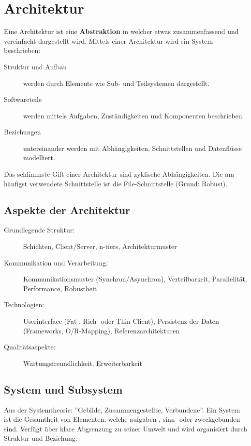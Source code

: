 \section{Architektur}
Eine Architektur ist eine \textbf{Abstraktion} in welcher etwas zusammenfassend und vereinfacht dargestellt wird. Mittels einer Architektur wird ein System beschrieben:

\begin{description}
	\item[Struktur und Aufbau] werden durch Elemente wie Sub- und Teilsystemen dargestellt.
	\item[Softwareteile] werden mittels Aufgaben, Zuständigkeiten und Komponenten beschrieben.
	\item [Beziehungen] untereinander werden mit Abhängigkeiten, Schnittstellen und Datenflüsse modelliert.
\end{description}

Das schlimmste Gift einer Architektur sind zyklische Abhängigkeiten. Die am häufigst verwendete Schnittstelle ist die File-Schnittstelle (Grund: Robust).

\subsection{Aspekte der Architektur}
\begin{description}
	\item[Grundlegende Struktur:] Schichten, Client/Server, n-tiers, Architekturmuster
	\item[Kommunikation und Verarbeitung:] Kommunikationsmuster (Synchron/Asynchron), Verteilbarkeit, Parallelität, Performance, Robustheit
	\item[Technologien:] Userinterface (Fat-, Rich- oder Thin-Client), Persistenz der Daten (Frameworks, O/R-Mapping), Referenzarchitekturen
	\item[Qualitätsaspekte:] Wartungsfreundlichkeit, Erweiterbarkeit
\end{description}

\subsection{System und Subsystem}
Aus der Systemtheorie: ''Gebilde, Zusammengestellte, Verbundene''. Ein System ist die Gesamtheit von Elementen, welche aufgaben-, sinn- oder zweckgebunden sind. Verfügt über klare Abgrenzung zu seiner Umwelt und wird organisiert durch Struktur und Beziehung.

